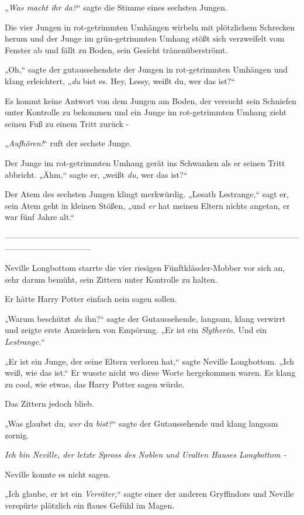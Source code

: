 {„\emph{Was macht ihr da?}“ sagte die Stimme eines sechsten Jungen.

Die vier Jungen in rot-getrimmten Umhängen wirbeln mit plötzlichem Schrecken herum und der Junge im grün-getrimmten Umhang stößt sich verzweifelt vom Fenster ab und fällt zu Boden, sein Gesicht tränenüberströmt.

„Oh,“ sagte der gutaussehendste der Jungen in rot-getrimmten Umhängen und klang erleichtert, „\emph{du} bist es. Hey, Lessy, weißt du, wer das ist?“

Es kommt keine Antwort von dem Jungen am Boden, der versucht sein Schniefen unter Kontrolle zu bekommen und ein Junge im rot-getrimmten Umhang zieht seinen Fuß zu einem Tritt zurück -

„\emph{Aufhören!}“ ruft der sechste Junge.

Der Junge im rot-getrimmten Umhang gerät ins Schwanken als er seinen Tritt abbricht. „Ähm,“ sagte er, „weißt \emph{du,} wer das ist?“

Der Atem des sechsten Jungen klingt merkwürdig. „Lesath Lestrange,“ sagt er, sein Atem geht in kleinen Stößen, „und \emph{er} hat meinen Eltern nichts angetan, er war fünf Jahre alt.“

--------------------------------------------------------------------------------------------------------------------------------------------

Neville Longbottom starrte die vier riesigen Fünftklässler-Mobber vor sich an, sehr darum bemüht, sein Zittern unter Kontrolle zu halten.

Er hätte Harry Potter einfach nein sagen sollen.

„Warum beschützt \emph{du} ihn?“ sagte der Gutaussehende, langsam, klang verwirrt und zeigte erste Anzeichen von Empörung. „Er ist ein \emph{Slytherin.} Und ein \emph{Lestrange.}“

„Er ist ein Junge, der seine Eltern verloren hat,“ sagte Neville Longbottom. „Ich weiß, wie das ist.“ Er wusste nicht wo diese Worte hergekommen waren. Es klang zu cool, wie etwas, das Harry Potter sagen würde.

Das Zittern jedoch blieb.

„Was glaubst du, \emph{wer} du \emph{bist?}“ sagte der Gutaussehende und klang langsam zornig.

\emph{Ich bin Neville, der letzte Spross des Noblen und Uralten Hauses Longbottom -}

Neville konnte es nicht sagen.

„Ich glaube, er ist ein \emph{Verräter,}“ sagte einer der anderen Gryffindors und Neville verspürte plötzlich ein flaues Gefühl im Magen.

}
